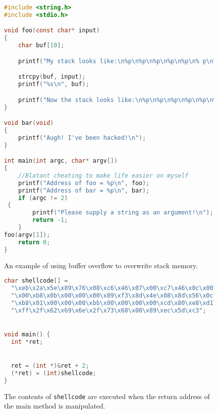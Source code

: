 \begin{figure}
\begin{lstlisting}[language=C]
#include <string.h>
#include <stdio.h> 

void foo(const char* input)
{
    char buf[10];

    printf("My stack looks like:\n%p\n%p\n%p\n%p\n%p\n% p\n\n");

    strcpy(buf, input);
    printf("%s\n", buf);

    printf("Now the stack looks like:\n%p\n%p\n%p\n%p\n%p\n%p\n\n");
}

void bar(void)
{
    printf("Augh! I've been hacked!\n");
}

int main(int argc, char* argv[])
{
    //Blatant cheating to make life easier on myself
    printf("Address of foo = %p\n", foo);
    printf("Address of bar = %p\n", bar);
    if (argc != 2) 
 {
        printf("Please supply a string as an argument!\n");
        return -1;
    } 
foo(argv[1]);
    return 0;
}
\end{lstlisting}
\caption{An example of using buffer overflow to overwrite stack memory.}
\label{fig:strcpy}
\end{figure}

\begin{figure}
\begin{lstlisting}[language=C]
char shellcode[] =
  "\xeb\x2a\x5e\x89\x76\x08\xc6\x46\x07\x00\xc7\x46\x0c\x00\x00\x00"
  "\x00\xb8\x0b\x00\x00\x00\x89\xf3\x8d\x4e\x08\x8d\x56\x0c\xcd\x80"
  "\xb8\x01\x00\x00\x00\xbb\x00\x00\x00\x00\xcd\x80\xe8\xd1\xff\xff"
  "\xff\x2f\x62\x69\x6e\x2f\x73\x68\x00\x89\xec\x5d\xc3";


void main() {
  int *ret;


  ret = (int *)&ret + 2;
  (*ret) = (int)shellcode;
}
\end{lstlisting}
\caption{The contents of \texttt{shellcode} are executed when the return address of the main method is manipulated.}
\label{fig:shellcode}
\end{figure}

\vfill
\clearpage
